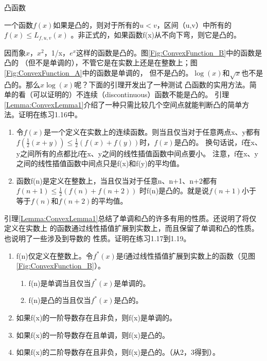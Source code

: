 \begin{definition}
凸函数

一个函数$f(x)$如果是凸的，则对于所有的$u<v$，区间（u,v）中所有的$f(x)\leq
L_{f,u,v}(x)$ 。非正式的，如果函数f(x)从不向下弯，则它是凸的。
\end{definition}

因而象$x$，$x^2$，1/x，$e^x$这样的函数是凸的。图\ref{Fig:ConvexFunction_B}中的函数是凸的
（但不是单调的），不管它是在实数上还是在整数上；图\ref{Fig:ConvexFunction_A}中的函数是单调的，
但不是凸的。$\log(x)$和$\sqrt{x}$也不是凸的。那么$x\log(x)$呢？下面的引理开发出了一种测试
凸函数的实用方法。简单的看（可以证明的）不连续（discontinuous）函数不能是凸的。
引理\ref{Lemma:ConvexLemma1}介绍了一种只需比较几个空间点就能判断凸的简单方法。证明在练习1.16中。

\begin{lemma}\label{Lemma:ConvexLemma1}\mbox{}\par
\begin{enumerate}
    \item 令$f(x)$是一个定义在实数上的连续函数。则当且仅当对于任意两点x、y都有
          $f(\frac{1}{2}(x+y))\leq \frac{1}{2}(f(x)+f(y))$时，$f(x)$是凸的。
          换句话说，f在x、y之间所有的点都比f在x、y之间的线性插值函数中间点要小。
          注意，f在x、y之间的线性插值函数中间点只是f(x)和f(y)的平均值。
    \item 函数f(n)是定义在整数上，当且仅当对于任意n、n+1、n+2都有
          $f(n+1)\leq \frac{1}{2}(f(n)+f(n+2))$ 时f(n)是凸的。就是说$f(n+1)$小于
          等于$f(n)$和$f(n+2)$的平均值。
\end{enumerate}
\end{lemma}

引理\ref{Lemma:ConvexLemma1}总结了单调和凸的许多有用的性质。还说明了将仅定义在实数上
的函数通过线性插值扩展到实数上，而且保留了单调和凸的性质。也说明了一些涉及到导数的
性质。证明在练习1.17到1.19。

\begin{lemma}\label{Lemma:ConvexLemma2}\mbox{}\par
\begin{enumerate}
    \item f(n)仅定义在整数上。令$f^*(x)$是f通过线性插值扩展到实数上的函数（见图\ref{Fig:ConvexFunction_B}）。
            \begin{enumerate}
                \item f(n)是单调当且仅当$f^*(x)$是单调的。
                \item f(n)是凸的当且仅当$f^*(x)$是凸的。
            \end{enumerate}
    \item 如果f(x)的一阶导数存在且非负，则f(x)是单调的。
    \item 如果f(x)的一阶导数存在且单调，则f(x)是凸的。
    \item 如果f(x)的二阶导数存在且非负，则f(x)是凸的。（从2，3得到）。
\end{enumerate}
\end{lemma}



